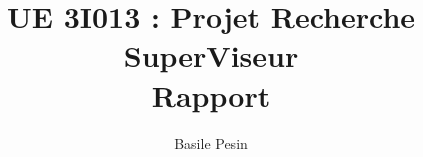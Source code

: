 \documentclass{article}
\title{UE 3I013 : Projet Recherche\\
    SuperViseur\\
    Rapport}
\author{Basile Pesin}
\begin{document}
\maketitle
\newpage

{}

\end{document}
